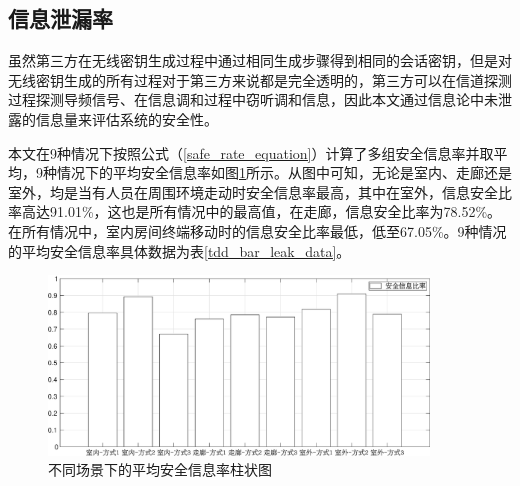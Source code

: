 \documentclass[master]{seuthesis} %
\begin{document}
\begin{Main}
\subsection{信息泄漏率}

虽然第三方在无线密钥生成过程中通过相同生成步骤得到相同的会话密钥，但是对无线密钥生成的所有过程对于第三方来说都是完全透明的\cite{sahin2016secure}，第三方可以在信道探测过程探测导频信号、在信息调和过程中窃听调和信息，因此本文通过信息论中未泄露的信息量来评估系统的安全性。

本文在9种情况下按照公式（\ref{safe_rate_equation}）计算了多组安全信息率并取平均，9种情况下的平均安全信息率如图\ref{tdd_bar_leak}所示。从图中可知，无论是室内、走廊还是室外，均是当有人员在周围环境走动时安全信息率最高，其中在室外，信息安全比率高达91.01\%，这也是所有情况中的最高值，在走廊，信息安全比率为78.52\%。在所有情况中，室内房间终端移动时的信息安全比率最低，低至67.05\%。9种情况的平均安全信息率具体数据为表\ref{tdd_bar_leak_data}。


\begin{figure}[htbp!]
    \centering \includegraphics[width=0.9\textwidth]{images/tdd-leak/bar.eps}
    \caption{不同场景下的平均安全信息率柱状图}
    \label{tdd_bar_leak}
\end{figure}



\end{Main}
\end{document}
